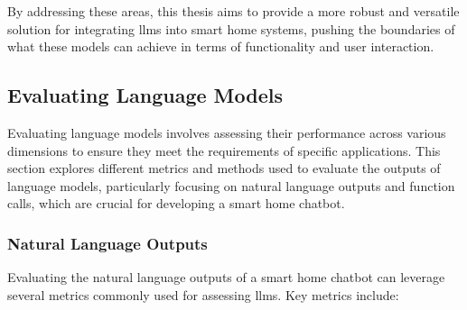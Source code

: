 By addressing these areas, this thesis aims to provide a more robust and versatile solution for integrating \glspl{llm} into smart home systems, pushing the boundaries of what these models can achieve in terms of functionality and user interaction.


\subsection{Evaluating Language Models}
\label{sec:relatedeval}
Evaluating language models involves assessing their performance across various dimensions to ensure they meet the requirements of specific applications. This section explores different metrics and methods used to evaluate the outputs of language models, particularly focusing on natural language outputs and function calls, which are crucial for developing a smart home chatbot.

\subsubsection{Natural Language Outputs}
Evaluating the natural language outputs of a smart home chatbot can leverage several metrics commonly used for assessing \glspl{llm}. Key metrics include:

